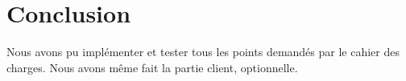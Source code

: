 \section{Conclusion}
Nous avons pu implémenter et tester tous les points demandés par le cahier des charges. Nous avons même fait la partie client, optionnelle.